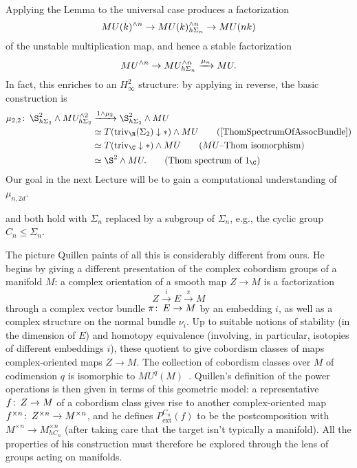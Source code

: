 Applying the Lemma to the universal case produces a factorization \[MU(k)^{\wedge n} \to MU(k)^{\wedge n}_{h\Sigma_n} \to MU(nk)\] of the unstable multiplication map, and hence a stable factorization \[MU^{\wedge n} \to MU^{\wedge n}_{h\Sigma_n} \xrightarrow{\mu_n} MU.\]  In fact, this enriches to an \(H_\infty^2\) structure: by applying  in reverse, the basic construction is
\begin{align*}
\mu_{2,2}\co \S^2_{h\Sigma_2} \sm MU^{\sm 2}_{h\Sigma_2} & \xrightarrow{1 \sm \mu_2} \S^2_{h\Sigma_2} \sm MU \\
& \simeq T(\mathrm{triv}_{\R}(\Sigma_2) \downarrow *) \sm MU \tag{\Cref{ThomSpectrumOfAssocBundle}} \\
& \simeq T(\mathrm{triv}_{\C} \downarrow *) \sm MU \tag{\(MU\)--Thom isomorphism} \\
& \simeq \S^2 \sm MU. \tag{Thom spectrum of \(1_{\C}\)}
\end{align*}
Our goal in the next Lecture will be to gain a computational understanding of \(\mu_{n,2d}\).

\begin{remark}
 and  both hold with \(\Sigma_n\) replaced by a subgroup of \(\Sigma_n\), e.g., the cyclic group \(C_n \le \Sigma_n\).
\end{remark}

\begin{remark}
The picture Quillen paints of all this is considerably different from ours.  He begins by giving a different presentation of the complex cobordism groups of a manifold \(M\): a complex orientation of a smooth map \(Z \to M\) is a factorization \[Z \xrightarrow{i} E \xrightarrow{\pi} M\] through a complex vector bundle \(\pi\colon\thinspace E \to M\) by an embedding \(i\), as well as a complex structure on the normal bundle \(\nu_i\).  Up to suitable notions of stability (in the dimension of \(E\)) and homotopy equivalence (involving, in particular, isotopies of different embeddings \(i\)), these quotient to give cobordism classes of maps complex-oriented maps \(Z \to M\).  The collection of cobordism classes over \(M\) of codimension \(q\) is isomorphic to \(MU^q(M)\)~\cite[Proposition 1.2]{Quillen}.  Quillen's definition of the power operations is then given in terms of this geometric model: a representative \(f\colon\thinspace Z \to M\) of a cobordism class gives rise to another complex-oriented map \(f^{\times n}\colon\thinspace Z^{\times n} \to M^{\times n}\), and he defines \(P^{C_n}_{\mathrm{ext}}(f)\) to be the postcomposition with \(M^{\times n} \to M^{\times n}_{hC_n}\) (after taking care that the target isn't typically a manifold).  All the properties of his construction must therefore be explored through the lens of groups acting on manifolds.
\end{remark}

